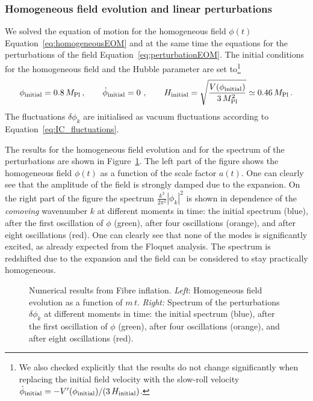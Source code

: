 \documentclass[12pt]{article}
\newcommand{\be}{\begin{equation}}
\newcommand{\ee}{\end{equation}}
\begin{document}
\subsubsection{Homogeneous field evolution and linear perturbations}
\label{sec:linear_fibre}
We solved the equation of motion for the homogeneous field $\phi(t)$ Equation~\eqref{eq:homogeneousEOM} and at the same time the equations for the perturbations of the field Equation~\eqref{eq:perturbationEOM}. The initial conditions for the homogeneous field and the Hubble parameter are set to\footnote{We also checked explicitly that the results do not change significantly when replacing the initial field velocity with the slow-roll velocity $\dot{\phi}_{\rm initial} = -V'(\phi_{\rm initial})/(3\,H_{\rm initial})$.}
\be
\phi_{\rm initial} = 0.8\,M_{\rm Pl}\,,\qquad\dot{\phi}_{\rm initial} = 0\,\,,\qquad H_{\rm initial}=\sqrt{\frac{V(\phi_{\rm initial})}{3\,M^2_{\rm Pl}}} \simeq 0.46\,M_{\rm Pl}\,.
\ee
The fluctuations $\delta\phi_k$ are initialised as vacuum fluctuations according to Equation~\eqref{eq:IC_fluctuations}.

The results for the homogeneous field evolution and for the spectrum of the perturbations are shown in Figure~\ref{fig:fld_and_specs}. The left part of the figure shows the homogeneous field $\phi(t)$ as a function of the scale factor $a(t)$. One can clearly see that the amplitude of the field is strongly damped due to the expansion. On the right part of the figure the spectrum $\frac{k^3}{2\pi^2}|\phi_k|^2$ is shown in dependence of the \textit{comoving} wavenumber $k$ at different moments in time: the initial spectrum (blue), after the first oscillation of $\phi$ (green), after four oscillations (orange), and after eight oscillations (red). One can clearly see that none of the modes is significantly excited, as already expected from the Floquet analysis. The spectrum is redshifted due to the expansion and the field can be considered to stay practically homogeneous.

\begin{figure}[tbp]
\centering
{}
\hfill
{}
\caption{Numerical results from Fibre inflation. \textit{Left}: Homogeneous field evolution as a function of $m\,t$. \textit{Right:} Spectrum of the perturbations $\delta\phi_k$ at different moments in time: the initial spectrum (blue), after the first oscillation of $\phi$ (green), after four oscillations (orange), and after eight oscillations (red).} 
\label{fig:fld_and_specs}
\end{figure}





{}

\end{document}
